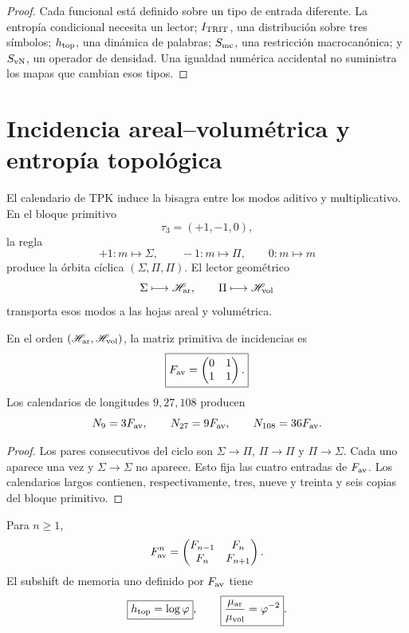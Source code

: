 \begin{proof}
Cada funcional está definido sobre un tipo de entrada diferente. La entropía
condicional necesita un lector; \(I_{\rm TRIT}\), una distribución sobre tres
símbolos; \(h_{\rm top}\), una dinámica de palabras; \(S_{\rm mc}\), una
restricción macrocanónica; y \(S_{\rm vN}\), un operador de densidad. Una
igualdad numérica accidental no suministra los mapas que cambian esos tipos.
\end{proof}

\section{Incidencia areal--volumétrica y entropía topológica}

El calendario de TPK induce la bisagra entre los modos aditivo y
multiplicativo. En el bloque primitivo
\[
 \tau_3=(+1,-1,0),
\]
la regla
\[
 +1:m\mapsto\Sigma,
 \qquad
 -1:m\mapsto\Pi,
 \qquad
 0:m\mapsto m
\]
produce la órbita cíclica \((\Sigma,\Pi,\Pi)\). El lector geométrico
\[
 \Sigma\longmapsto\mathscr H_{\rm ar},
 \qquad
 \Pi\longmapsto\mathscr H_{\rm vol}
\]
transporta esos modos a las hojas areal y volumétrica.

\begin{theorem}
\label{thm:incidencia-hojas-anexo}
En el orden \((\mathscr H_{\rm ar},\mathscr H_{\rm vol})\), la matriz
primitiva de incidencias es
\begin{equation}
 \boxed{
 F_{\rm av}=
 \begin{pmatrix}0&1\\1&1\end{pmatrix}.}
 \label{eq:fav-anexo-informacion}
\end{equation}
Los calendarios de longitudes \(9,27,108\) producen
\[
 N_9=3F_{\rm av},
 \qquad N_{27}=9F_{\rm av},
 \qquad N_{108}=36F_{\rm av}.
\]
\end{theorem}

\begin{proof}
Los pares consecutivos del ciclo son
\(\Sigma\to\Pi\), \(\Pi\to\Pi\) y \(\Pi\to\Sigma\). Cada uno aparece una
vez y \(\Sigma\to\Sigma\) no aparece. Esto fija las cuatro entradas de
\(F_{\rm av}\). Los calendarios largos contienen, respectivamente, tres,
nueve y treinta y seis copias del bloque primitivo.
\end{proof}

\begin{theorem}
\label{thm:fibonacci-parry-anexo}
Para \(n\geq1\),
\begin{equation}
 F_{\rm av}^{n}
 =\begin{pmatrix}F_{n-1}&F_n\\F_n&F_{n+1}\end{pmatrix}.
 \label{eq:potencias-fav-anexo}
\end{equation}
El subshift de memoria uno definido por \(F_{\rm av}\) tiene
\begin{equation}
 \boxed{h_{\rm top}=\log\varphi},
 \qquad
 \boxed{\frac{\mu_{\rm ar}}{\mu_{\rm vol}}=\varphi^{-2}}.
 \label{eq:entropia-parry-hojas-anexo}
\end{equation}
\end{theorem}

